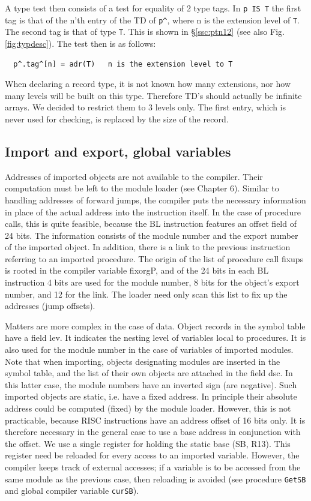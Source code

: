 A type test then consists of a test for equality of 2 type tags. In \verb|p IS T| the first tag is that
of the n’th entry of the TD of \verb|p^|, where n is the extension level of \verb|T|. The second tag is
that of type \verb|T|. This is shown in \S \ref{ssc:ptn12} (see also Fig. \ref{fig:typdesc}).
The test then is as follows:
\begin{verbatim}
  p^.tag^[n] = adr(T)   n is the extension level to T
\end{verbatim}

When declaring a record type, it is not known how many extensions, nor how many levels will be
built on this type. Therefore TD’s should actually be infinite arrays. We decided to restrict them to 3
levels only. The first entry, which is never used for checking, is replaced by the size of the record.

\subsection{Import and export, global variables}
Addresses of imported objects are not available to the compiler. Their computation must be left to
the module loader (see Chapter 6). Similar to handling addresses of forward jumps, the compiler
puts the necessary information in place of the actual address into the instruction itself. In the case
of procedure calls, this is quite feasible, because the BL instruction features an offset field of 24
bits. The information consists of the module number and the export number of the imported object.
In addition, there is a link to the previous instruction referring to an imported procedure. The origin
of the list of procedure call fixups is rooted in the compiler variable fixorgP, and of the 24 bits in
each BL instruction 4 bits are used for the module number, 8 bits for the object's export number,
and 12 for the link. The loader need only scan this list to fix up the addresses (jump offsets).

Matters are more complex in the case of data. Object records in the symbol table have a field lev. It
indicates the nesting level of variables local to procedures. It is also used for the module number in
the case of variables of imported modules. Note that when importing, objects designating modules
are inserted in the symbol table, and the list of their own objects are attached in the field dsc. In
this latter case, the module numbers have an inverted sign (are negative). Such imported objects are
static, i.e. have a fixed address. In principle their absolute address could be computed (fixed) by the
module loader. However, this is not practicable, because RISC instructions have an address offset
of 16 bits only. It is therefore necessary in the general case to use a base address in conjunction
with the offset. We use a single register for holding the static base (SB, R13). This register need be
reloaded for every access to an imported variable. However, the compiler keeps track of external
accesses; if a variable is to be accessed from the same module as the previous case, then
reloading is avoided (see procedure \verb|GetSB| and global compiler variable \verb|curSB|).

